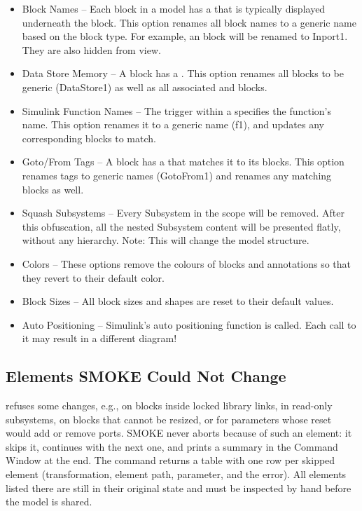 \documentclass{article}
\makeatletter
\newcommand{\toolname}{SMOKE\@\xspace}
\makeatother
\begin{document}
\begin{itemize}
	\item Block Names -- Each block in a model has a  that is typically displayed underneath the block. This option renames all block names to a generic name based on the block type. For example, an \inport block will be renamed to Inport1. They are also hidden from view.

	\item Data Store Memory -- A \DSM block has a . This option renames all  \DSM blocks to be generic (\eg DataStore1) as well as all associated \DSR and \DSW blocks.

	\item Simulink Function Names -- The trigger within a \simfunc specifies the function's name. This option renames it to a generic name (\eg f1), and updates any corresponding \simfunccaller blocks to match.
	
	\item Goto/From Tags -- A \goto block has a  that matches it to its \from blocks. This option renames tags to generic names (\eg GotoFrom1) and renames any matching \from blocks as well.
	
	\item Squash Subsystems -- Every Subsystem in the scope will be removed. After this obfuscation, all the nested Subsystem content will be presented flatly, without any hierarchy. Note: This will change the model structure.
	
	\item Colors -- These options remove the colours of blocks and annotations so that they revert to their default color.

	\item Block Sizes -- All block sizes and shapes are reset to their default values.

	\item Auto Positioning -- Simulink's auto positioning function is called. Each call to it may result in a different diagram!
\end{itemize}


\subsection{Elements \toolname Could Not Change}
\Simulink refuses some changes, e.g., on blocks inside locked library links, in read-only subsystems, on blocks that cannot be resized, or for parameters whose reset would add or remove ports. \toolname never aborts because of such an element: it skips it, continues with the next one, and prints a summary in the \Matlab Command Window at the end. The command  returns a table with one row per skipped element (transformation, element path, parameter, and the \Simulink error). All elements listed there are still in their original state and must be inspected by hand before the model is shared.
\end{document}
